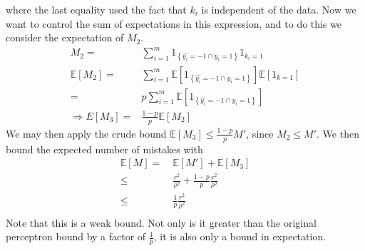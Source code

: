 \documentclass[12pt]{article}
\newcommand{\E}[0]{\mathbb{E}}
\begin{document}
where the last equality used the fact that $k_i$ is independent of the data.  Now we want to control the sum of expectations in this expression, and to do this we consider the expectation of $M_2$.
\begin{align*}
M_2 = & \sum_{i=1}^m 1_{\left\{\hat{y_i} = -1 \cap y_i = 1\right\}}1_{k_i = 1} \\
\E[M_2] = & \sum_{i=1}^m \E[1_{\left\{\hat{y_i} = -1 \cap y_i = 1\right\}}]\E[1_{k = 1}] \\
= & p\sum_{i=1}^m \E[1_{\left\{\hat{y_i} = -1 \cap y_i = 1\right\}}]\\
\Rightarrow E[M_3] = & \frac{1-p}{p}\E[M_2]
\end{align*}
We may then apply the crude bound $\E[M_3] \leq  \frac{1-p}{p}
M'$, since $M_2 \leq M'$. We then bound the expected number of mistakes with
\begin{align*}
\E[M]  =  &\ \E[M'] + \E[M_3] \\
\leq & \ \frac{r^2}{\rho^2} + \frac{1-p}{p}\frac{r^2}{\rho^2} \\
\leq  & \ \frac{1}{p}\frac{r^2}{\rho^2} \\
\end{align*}
Note that this is a weak bound.  Not only is it greater than the
original perceptron bound by a factor of $\frac{1}{p}$, it is also only a
bound in expectation.
\end{document}
